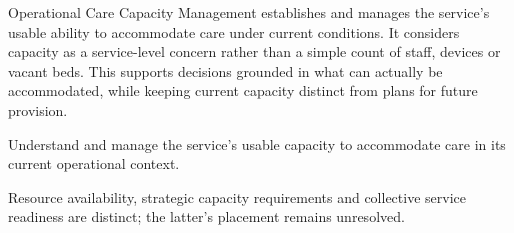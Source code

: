 Operational Care Capacity Management establishes and manages the service's usable ability to accommodate care under current conditions. It considers capacity as a service-level concern rather than a simple count of staff, devices or vacant beds. This supports decisions grounded in what can actually be accommodated, while keeping current capacity distinct from plans for future provision.



Understand and manage the service’s usable capacity to accommodate care in its current operational context.



Resource availability, strategic capacity requirements and collective service readiness are distinct; the latter's placement remains unresolved.


